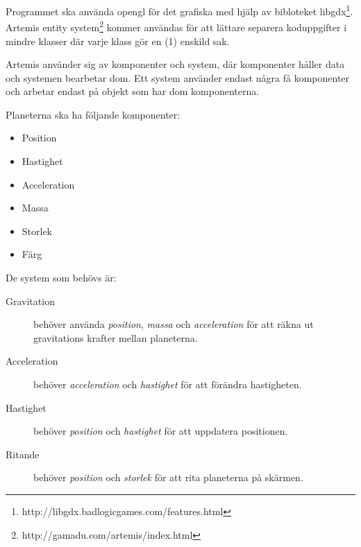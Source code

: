 Programmet ska använda opengl för det grafiska med hjälp av bibloteket
libgdx\footnote{http://libgdx.badlogicgames.com/features.html}.
Artemis entity system\footnote{http://gamadu.com/artemis/index.html}
kommer användas för att lättare separera koduppgifter i mindre
klasser där varje klass gör en (1) enskild sak.

Artemis använder sig av komponenter och system,
där komponenter håller data och systemen bearbetar dom.
Ett system använder endast några få komponenter och
arbetar endast på objekt som har dom komponenterna.

\noindent
Planeterna ska ha följande komponenter:
\begin{itemize}
    \item Position
    \item Hastighet
    \item Acceleration
    \item Massa
    \item Storlek
    \item Färg
\end{itemize}

\noindent
De system som behövs är:
\begin{description}
    \item[Gravitation] behöver använda
        \textit{position}, \textit{massa} och \textit{acceleration}
        för att räkna ut gravitations krafter mellan planeterna.
    \item [Acceleration] behöver \textit{acceleration} och \textit{hastighet}
        för att förändra hastigheten.
    \item [Hastighet] behöver \textit{position} och \textit{hastighet}
        för att uppdatera positionen.
    \item [Ritande] behöver \textit{position} och \textit{storlek}
        för att rita planeterna på skärmen.
\end{description}

